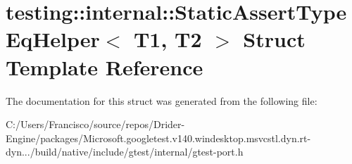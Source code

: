 \hypertarget{structtesting_1_1internal_1_1_static_assert_type_eq_helper}{}\section{testing\+:\+:internal\+:\+:Static\+Assert\+Type\+Eq\+Helper$<$ T1, T2 $>$ Struct Template Reference}
\label{structtesting_1_1internal_1_1_static_assert_type_eq_helper}


The documentation for this struct was generated from the following file\+:\begin{DoxyCompactItemize}
\item 
C\+:/\+Users/\+Francisco/source/repos/\+Drider-\/\+Engine/packages/\+Microsoft.\+googletest.\+v140.\+windesktop.\+msvcstl.\+dyn.\+rt-\/dyn.../build/native/include/gtest/internal/gtest-\/port.\+h\end{DoxyCompactItemize}
